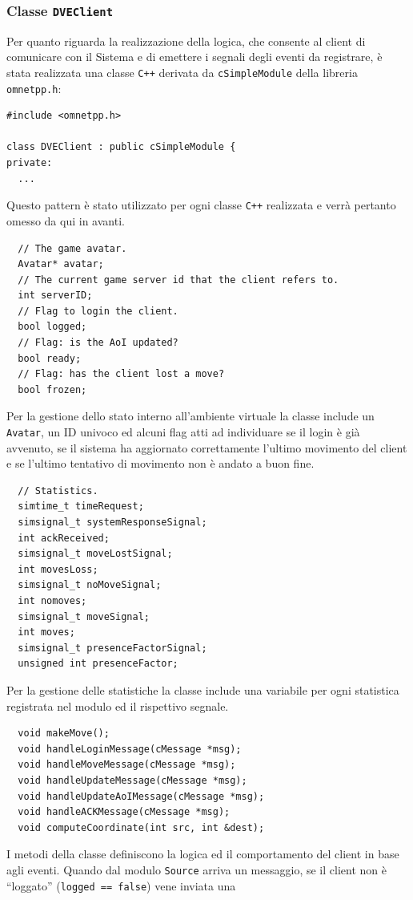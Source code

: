 \documentclass[a4paper, 11pt, oneside]{book}
\newcommand{\files}[1]{\texttt{#1}}
\theoremstyle{definition}
\theoremstyle{remark}
\begin{document}
\subsubsection{Classe \files{DVEClient}}
Per quanto riguarda la realizzazione della logica, che consente al client di
comunicare con il Sistema e di emettere i segnali degli eventi da registrare,
è stata realizzata una classe \texttt{C++} derivata da \texttt{cSimpleModule}
della libreria \texttt{omnetpp.h}:
\begin{lstlisting}
#include <omnetpp.h>

class DVEClient : public cSimpleModule {
private:
  ...
\end{lstlisting}
Questo pattern è stato utilizzato per ogni classe \texttt{C++} realizzata e
verrà pertanto omesso da qui in avanti.
\begin{lstlisting}
  // The game avatar.
  Avatar* avatar;
  // The current game server id that the client refers to.
  int serverID;
  // Flag to login the client.
  bool logged;
  // Flag: is the AoI updated?
  bool ready;
  // Flag: has the client lost a move?
  bool frozen;
\end{lstlisting}
Per la gestione dello stato interno all'ambiente virtuale la classe include un
\files{Avatar}, un ID univoco ed alcuni flag atti ad individuare se il login
è già avvenuto, se il sistema ha aggiornato correttamente l'ultimo movimento
del client e se l'ultimo tentativo di movimento non è andato a buon fine.
\begin{lstlisting}
  // Statistics.
  simtime_t timeRequest;
  simsignal_t systemResponseSignal;
  int ackReceived;
  simsignal_t moveLostSignal;
  int movesLoss;
  simsignal_t noMoveSignal;
  int nomoves;
  simsignal_t moveSignal;
  int moves;
  simsignal_t presenceFactorSignal;
  unsigned int presenceFactor;
\end{lstlisting}
Per la gestione delle statistiche la classe include una variabile per ogni
statistica registrata nel modulo ed il rispettivo segnale.
\begin{lstlisting}
  void makeMove();
  void handleLoginMessage(cMessage *msg);
  void handleMoveMessage(cMessage *msg);
  void handleUpdateMessage(cMessage *msg);
  void handleUpdateAoIMessage(cMessage *msg);
  void handleACKMessage(cMessage *msg);
  void computeCoordinate(int src, int &dest);
\end{lstlisting}
I metodi della classe definiscono la logica ed il comportamento del client
in base agli eventi. Quando dal modulo \files{Source} arriva un messaggio,
se il client non è ``loggato'' (\files{logged == false}) vene inviata una
\end{document}
